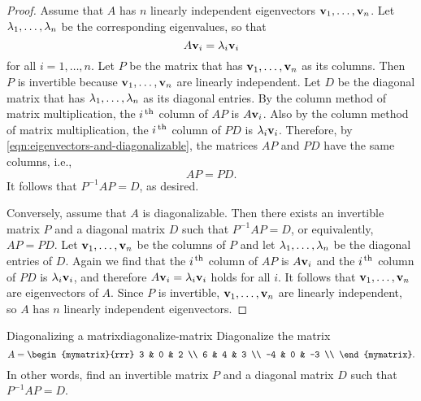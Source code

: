 \begin{proof}
  Assume that $A$ has $n$ linearly independent eigenvectors
  $\vect{v}_1,\ldots,\vect{v}_n$. Let
  $\lambda_1,\ldots,\lambda_n$ be the corresponding eigenvalues,
  so that
  \begin{equation}\label{eqn:eigenvectors-and-diagonalizable}
    A\vect{v}_i = \eigenvar_i\vect{v}_i
  \end{equation}
  for all $i=1,\ldots,n$. Let $P$ be the matrix that has
  $\vect{v}_1,\ldots,\vect{v}_n$ as its columns. Then $P$ is
  invertible because $\vect{v}_1,\ldots,\vect{v}_n$ are linearly
  independent. Let $D$ be the diagonal matrix that has
  $\lambda_1,\ldots,\lambda_n$ as its diagonal entries.  By the
  column method of matrix multiplication, the $i^{\,\rm th}$ column of $AP$ is
  $A\vect{v}_i$. Also by the column method of matrix multiplication,
  the $i^{\,\rm th}$ column of $PD$ is $\eigenvar_i\vect{v}_i$.  Therefore, by
  {\eqref{eqn:eigenvectors-and-diagonalizable}}, the matrices $AP$ and
  $PD$ have the same columns, i.e.,
  \begin{equation*}
    AP = PD.
  \end{equation*}
  It follows that $P^{-1}AP = D$, as desired.

  Conversely, assume that $A$ is diagonalizable. Then there exists an
  invertible matrix $P$ and a diagonal matrix $D$ such that
  $P^{-1}AP=D$, or equivalently, $AP=PD$. Let
  $\vect{v}_1,\ldots,\vect{v}_n$ be the columns of $P$ and let
  $\lambda_1,\ldots,\lambda_n$ be the diagonal entries of $D$.
  Again we find that the $i^{\,\rm th}$ column of $AP$ is $A\vect{v}_i$ and
  the $i^{\,\rm th}$ column of $PD$ is $\eigenvar_i\vect{v}_i$, and therefore
  $A\vect{v}_i = \eigenvar_i\vect{v}_i$ holds for all $i$. It follows
  that $\vect{v}_1,\ldots,\vect{v}_n$ are eigenvectors of $A$. Since
  $P$ is invertible, $\vect{v}_1,\ldots,\vect{v}_n$ are linearly
  independent, so $A$ has $n$ linearly independent eigenvectors.
\end{proof}

\begin{example}{Diagonalizing a matrix}{diagonalize-matrix}
  Diagonalize the matrix
  \begin{equation*}
    A=\begin{mymatrix}{rrr}
      3  & 0 &  2 \\
      6  & 4 &  3 \\
      -4 & 0 & -3 \\
    \end{mymatrix}.
  \end{equation*}
  In other words, find an invertible matrix $P$ and a diagonal matrix
  $D$ such that $P^{-1}AP=D$.
\end{example}

